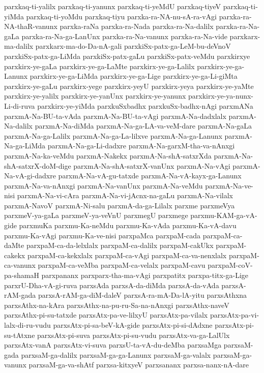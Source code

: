 {parxkaq-ti-yalilx
parxkaq-ti-yanunx
parxkaq-ti-yeMdU
parxkaq-tiyeV
parxkaq-ti-yiMda
parxkaq-ti-yoMdu
parxkaq-tiyu
parxka-ra-NA-nu-sA-ra-vAgi
parxka-ra-NA-thaR-vanunx
parxka-raNa
parxka-ra-Nada
parxka-ra-Na-dalilx
parxka-ra-Na-gaLa
parxka-ra-Na-ga-LanUnx
parxka-ra-Na-vanunx
parxka-ra-Na-vide
parxkarx-ma-dalilx
parxkarx-ma-do-Da-nA-gali
parxkiSx-patx-ga-LeM-bu-deVnoV
parxkiSx-patx-ga-LiMda
parxkiSx-patx-gaLu
parxkiSx-patx-veMdu
parxkirxye
parxkirx-ye-gaLa
parxkirx-ye-ga-LaMte
parxkirx-ye-ga-Lalilx
parxkirx-ye-ga-Lanunx
parxkirx-ye-ga-LiMda
parxkirx-ye-ga-Lige
parxkirx-ye-ga-Li-giMta
parxkirx-ye-gaLu
parxkirx-yege
parxkirx-yeyU
parxkirx-yeya
parxkirx-ye-yaMte
parxkirx-ye-yalilx
parxkirx-ye-yanUnx
parxkirx-ye-yanunx
parxkirx-ye-ya-nunx-Li-di-ruva
parxkirx-ye-yiMda
parxkuSxbadhx
parxkuSx-badhx-nAgi
parxmANa
parxmA-Na-BU-ta-vAda
parxmA-Na-BU-ta-vAgi
parxmA-Na-dadxlalx
parxmA-Na-dalilx
parxmA-Na-diMda
parxmA-Na-ga-LA-va-veM-dare
parxmA-Na-gaLa
parxmA-Na-ga-Lalilx
parxmA-Na-ga-La-lilxve
parxmA-Na-ga-Lanunx
parxmA-Na-ga-LiMda
parxmA-Na-ga-Li-dadxre
parxmA-Na-garxM-tha-va-nAnxgi
parxmA-Na-ka-veMdu
parxmA-Nakekx
parxmA-Na-shA-satxrXda
parxmA-Na-shA-satxrX-doM-dige
parxmA-Na-shA-satxrX-vanUnx
parxmA-Na-vAgi
parxmA-Na-vA-gi-dadxre
parxmA-Na-vA-gu-tatxde
parxmA-Na-vA-kayx-ga-Lanunx
parxmA-Na-va-nAnxgi
parxmA-Na-vanUnx
parxmA-Na-veMdu
parxmA-Na-ve-nisi
parxmA-Na-vi-cAra
parxmA-Na-vi-jAcnx-na-gaLu
parxmA-Na-vilalx
parxmA-NavoV
parxmA-Ni-salu
parxmA-da-ga-Lilalx
parxme
parxmeVya
parxmeV-ya-gaLa
parxmeV-ya-veVnU
parxmegU
parxmege
parxmu-KAM-ga-vA-gide
parxmuKa
parxmu-Ka-neMdu
parxmu-Ka-vAda
parxmu-Ka-vA-davu
parxmu-Ka-vAgi
parxmu-Ka-ve-nisi
parxpaMca
parxpaM-cada
parxpaM-ca-daMte
parxpaM-ca-da-lelxlalx
parxpaM-ca-dalilx
parxpaM-cakUkx
parxpaM-cakekx
parxpaM-ca-kekxlalx
parxpaM-ca-vAgi
parxpaM-ca-va-nenxlalx
parxpaM-ca-vanunx
parxpaM-ca-veMba
parxpaM-ca-velalx
parxpaM-cavu
parxpaM-coV-pa-shamaH
parxpananx
parxparx-tha-ma-vAgi
parxpatitx
parxpa-titx-ga-Lige
parxrU-Dha-vA-gi-ruva
parxsAda
parxsA-da-diMda
parxsA-da-vAda
parxsA-rAM-gada
parxsA-rAM-ga-diM-daleV
parxsA-ra-mA-Da-lA-yitu
parxsAthxna
parxsAthx-na-kAra
parxsAthx-na-pu-ru-Sa-na-nAnxgi
parxsAthx-naveV
parxsAthx-pi-su-tatxde
parxsAtx-pa-ve-lilxyU
parxsAtx-pa-vilalx
parxsAtx-pa-vi-lalx-di-ru-vudu
parxsAtx-pi-sa-beV-kA-gide
parxsAtx-pi-si-dAdxne
parxsAtx-pi-su-tAtxne
parxsAtx-pi-suva
parxsAtx-pi-su-vudu
parxsAtx-va-ga-LalUlx
parxsAtx-vanA
parxsAtx-vi-suva
parxsU-ta-vA-du-deMba
parxsaMga
parxsaM-gada
parxsaM-ga-dalilx
parxsaM-ga-ga-Lanunx
parxsaM-ga-valalx
parxsaM-ga-vanunx
parxsaM-ga-va-shAtf
parxsa-kitxyeV
parxsananx
parxsa-nanx-nA-dare
}
